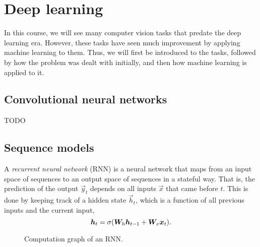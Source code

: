 \section{Deep learning}

In this course, we will see many computer vision tasks that predate the deep
learning era. However, these tasks have seen much improvement by applying
machine learning to them. Thus, we will first be introduced to the tasks,
followed by how the problem was dealt with initially, and then how machine
learning is applied to it.

\subsection{Convolutional neural networks}

TODO

\subsection{Sequence models}


A \textit{recurrent neural network} (RNN) \citep{rumelhart1985learning} is a
neural network that maps from an input space of sequences to an output space of
sequences in a stateful way. That is, the prediction of the output $\vec{y}_t$
depends on all inputs $\vec{x}$ that came before $t$. This is done by keeping
track of a hidden state $\vec{h}_t$, which is a function of all previous inputs
and the current input, \[
  \bm{h}_t = \sigma(\bm{W}_h\bm{h}_{t-1}+\bm{W}_x\bm{x}_t)
.\]

\begin{figure}
  \centering
  \caption{Computation graph of an RNN.}
  \label{fig:rnn}
\end{figure}

